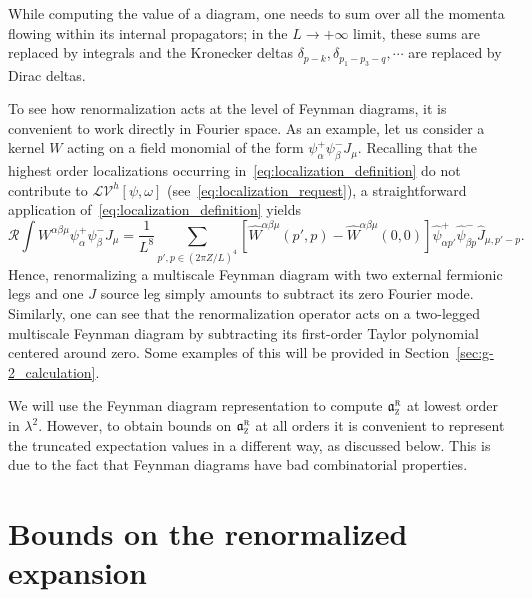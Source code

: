 \documentclass[a4paper, 11pt]{article}
\newcommand{\gyr}{\mathfrak{a}}								%
\newcommand{\rgyr}{\gyr_\textsc{z}^\textsc{r}}
\newcommand{\sing}[2]{{#1}^{#2}}							%
\newcommand{\loc}{\mathcal{L}}								%
\newcommand{\ren}{\mathcal{R}}								%
\theoremstyle{thm}
\begin{document}
\noindent
While computing the value of a diagram, one needs to sum over all the momenta flowing within its internal propagators; in the $L \to +\infty$ limit, these sums are replaced by integrals and the Kronecker deltas $\delta_{p - k}, \delta_{p_1 - p_3 - q}, \cdots$ are replaced by Dirac deltas.

To see how renormalization acts at the level of Feynman diagrams, it is convenient to work directly in Fourier space. As an example, let us consider a kernel $W$ acting on a field monomial of the form $\psi^+_\alpha \psi^-_\beta J_\mu$. Recalling that the highest order localizations occurring in~\eqref{eq:localization_definition} do not contribute to $\loc \sing{\mathscr{V}}{h}[\psi, \omega]$ (see~\eqref{eq:localization_request}), a straightforward application of~\eqref{eq:localization_definition} yields
\begin{equation}
\ren \int W^{\alpha \beta \mu} \psi^+_\alpha \psi^-_\beta J_\mu = \frac{1}{L^8} \sum_{p', p \in (2\pi Z/L)^4} [\hat{W}^{\alpha \beta \mu}(p', p) - \hat{W}^{\alpha \beta \mu}(0, 0)] \hat{\psi}^+_{\alpha p'} \hat{\psi}^-_{\beta p} \hat{J}_{\mu, p' - p}.
\end{equation}
Hence, renormalizing a multiscale Feynman diagram with two external fermionic legs and one $J$ source leg simply amounts to subtract its zero Fourier mode. Similarly, one can see that the renormalization operator acts on a two-legged multiscale Feynman diagram by subtracting its first-order Taylor polynomial centered around zero. Some examples of this will be provided in Section~\ref{sec:g-2_calculation}.

We will use the Feynman diagram representation to compute $\rgyr$ at lowest order in $\lambda^2$. However, to obtain bounds on $\rgyr$ at all orders it is convenient to represent the truncated expectation values in a different way, as discussed below. This is due to the fact that Feynman diagrams have bad combinatorial properties.

\section{Bounds on the renormalized expansion}
\label{sec:renormalized_expansion_bounds}
\end{document}
